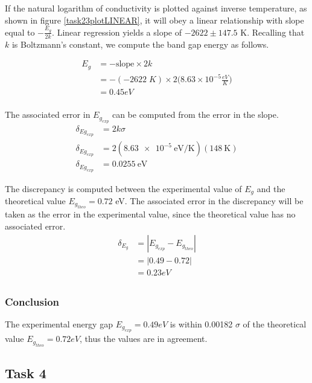 \documentclass[a4paper]{article}
\begin{document}
\qq If the natural logarithm of conductivity is plotted against
inverse temperature, as shown in figure \ref{task23plotLINEAR}, it
will obey a linear relationship with slope equal to $-
\frac{E_g}{2k}$. Linear regression yields a slope of $-2622 \pm
147.5$ K. Recalling that $k$ is Boltzmann's constant, we
compute the band gap energy as follows.

\begin{align*}
E_g &= - \text{slope} \times 2k \\
    &= - (-2622 \; K) \times 2 
       \Big( 8.63 \times 10^{-5} \frac{eV}{K} \Big) \\
    &= 0.45 eV \\
\end{align*}

The associated error in $E_{g_{exp}}$ can be computed from the error in the slope.
\begin{align*}
  \delta_{Eg_{exp}} &= 2 k \sigma\\
  \delta_{Eg_{exp}} &= 2 (\SI{8.63e-5}{\electronvolt\per\kelvin}) (\SI{148}{\kelvin}) \\
  \delta_{Eg_{exp}} &= \SI{0.0255}{\electronvolt}
\end{align*}

\qq The discrepancy is computed between the experimental value of
$E_g$ and the theoretical value $E_{g_{theo}} = 0.72$ eV. The
associated error in the discrepancy will be taken as the error in the
experimental value, since the theoretical value has no associated
error.
\begin{align*}
\delta_{E_g} &= | E_{g_{exp}} - E_{g_{theo}} | \\
		     &= | 0.49 - 0.72 | \\
		     &= 0.23 eV \\
\end{align*}

\subsubsection{Conclusion}
\qq The experimental energy gap $E_{g_{exp}} = 0.49 eV$ is within
\num{0.00182} $\sigma$ of the theoretical value $E_{g_{theo}} = 0.72 eV$,
thus the values are in agreement.

\subsection{Task 4}
\end{document}
